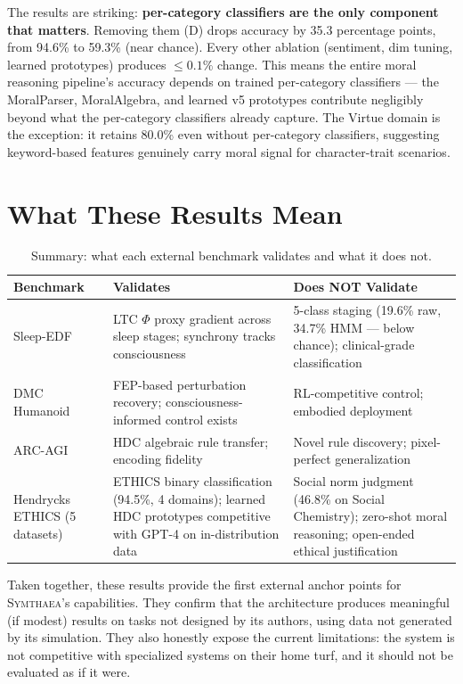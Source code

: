 \documentclass[12pt]{book}
\newcommand{\symthaea}{\textsc{Symthaea}}
\begin{document}
The results are striking: \textbf{per-category classifiers are the only component that matters}. Removing them (D) drops accuracy by 35.3 percentage points, from 94.6\% to 59.3\% (near chance). Every other ablation (sentiment, dim tuning, learned prototypes) produces $\leq 0.1\%$ change. This means the entire moral reasoning pipeline's accuracy depends on trained per-category classifiers --- the MoralParser, MoralAlgebra, and learned v5 prototypes contribute negligibly beyond what the per-category classifiers already capture. The Virtue domain is the exception: it retains 80.0\% even without per-category classifiers, suggesting keyword-based features genuinely carry moral signal for character-trait scenarios.

\section{What These Results Mean}

\begin{table}[H]
\centering
\caption{Summary: what each external benchmark validates and what it does not.}
\label{tab:external-summary}
\begin{tabular}{p{2.5cm}p{4cm}p{5cm}}
\toprule
\textbf{Benchmark} & \textbf{Validates} & \textbf{Does NOT Validate} \\
\midrule
Sleep-EDF & LTC $\Phi$ proxy gradient across sleep stages; synchrony tracks consciousness & 5-class staging (19.6\% raw, 34.7\% HMM --- below chance); clinical-grade classification \\
DMC Humanoid & FEP-based perturbation recovery; consciousness-informed control exists & RL-competitive control; embodied deployment \\
ARC-AGI & HDC algebraic rule transfer; encoding fidelity & Novel rule discovery; pixel-perfect generalization \\
Hendrycks ETHICS (5 datasets) & ETHICS binary classification (94.5\%, 4 domains); learned HDC prototypes competitive with GPT-4 on in-distribution data & Social norm judgment (46.8\% on Social Chemistry); zero-shot moral reasoning; open-ended ethical justification \\
\bottomrule
\end{tabular}
\end{table}

Taken together, these results provide the first external anchor points for \symthaea{}'s capabilities. They confirm that the architecture produces meaningful (if modest) results on tasks not designed by its authors, using data not generated by its simulation. They also honestly expose the current limitations: the system is not competitive with specialized systems on their home turf, and it should not be evaluated as if it were.
\end{document}
